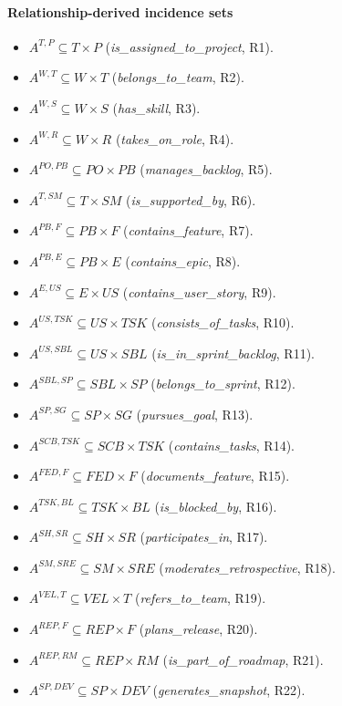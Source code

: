 \documentclass[11pt]{article}
\begin{document}
\paragraph{Relationship-derived incidence sets}
\begin{itemize}[leftmargin=2em,itemsep=0.2em]
  \item $A^{T,P}\subseteq T\times P$ (\emph{is\_assigned\_to\_project}, R1).
  \item $A^{W,T}\subseteq W\times T$ (\emph{belongs\_to\_team}, R2).
  \item $A^{W,S}\subseteq W\times S$ (\emph{has\_skill}, R3).
  \item $A^{W,R}\subseteq W\times R$ (\emph{takes\_on\_role}, R4).
  \item $A^{PO,PB}\subseteq PO\times PB$ (\emph{manages\_backlog}, R5).
  \item $A^{T,SM}\subseteq T\times SM$ (\emph{is\_supported\_by}, R6).
  \item $A^{PB,F}\subseteq PB\times F$ (\emph{contains\_feature}, R7).
  \item $A^{PB,E}\subseteq PB\times E$ (\emph{contains\_epic}, R8).
  \item $A^{E,US}\subseteq E\times US$ (\emph{contains\_user\_story}, R9).
  \item $A^{US,TSK}\subseteq US\times TSK$ (\emph{consists\_of\_tasks}, R10).
  \item $A^{US,SBL}\subseteq US\times SBL$ (\emph{is\_in\_sprint\_backlog}, R11).
  \item $A^{SBL,SP}\subseteq SBL\times SP$ (\emph{belongs\_to\_sprint}, R12).
  \item $A^{SP,SG}\subseteq SP\times SG$ (\emph{pursues\_goal}, R13).
  \item $A^{SCB,TSK}\subseteq SCB\times TSK$ (\emph{contains\_tasks}, R14).
  \item $A^{FED,F}\subseteq FED\times F$ (\emph{documents\_feature}, R15).
  \item $A^{TSK,BL}\subseteq TSK\times BL$ (\emph{is\_blocked\_by}, R16).
  \item $A^{SH,SR}\subseteq SH\times SR$ (\emph{participates\_in}, R17).
  \item $A^{SM,SRE}\subseteq SM\times SRE$ (\emph{moderates\_retrospective}, R18).
  \item $A^{VEL,T}\subseteq VEL\times T$ (\emph{refers\_to\_team}, R19).
  \item $A^{REP,F}\subseteq REP\times F$ (\emph{plans\_release}, R20).
  \item $A^{REP,RM}\subseteq REP\times RM$ (\emph{is\_part\_of\_roadmap}, R21).
  \item $A^{SP,DEV}\subseteq SP\times DEV$ (\emph{generates\_snapshot}, R22).
\end{itemize}
\end{document}
